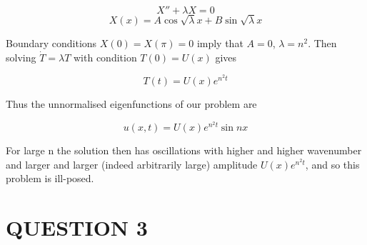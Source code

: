 \documentclass[a4paper]{article}
\begin{document}
\[ X'' + \lambda X = 0 \]
\[ X(x) = A \cos \sqrt{\lambda} x + B \sin \sqrt{\lambda} x \]

Boundary conditions $ X(0) = X(\pi) = 0 $ imply that $ A = 0 $, $ \lambda = n^{2} $. Then solving $ \dot{T} = \lambda T $ with condition $ T(0) = U(x) $ gives

\[ T(t) = U(x) e^{n^{2}t} \]

Thus the unnormalised eigenfunctions of our problem are

\[ u(x,t) = U(x) e^{n^{2}t} \sin n x  \]

For large n the solution then has oscillations with higher and higher wavenumber and larger and larger (indeed arbitrarily large) amplitude $ U(x) e^{n^{2}t} $, and so this problem is ill-posed.

\section{QUESTION 3}
\end{document}
